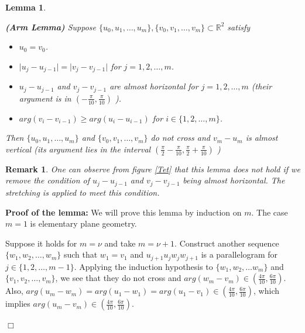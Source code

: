 \documentclass[openright, 12pt]{article}
\newtheorem{lema}[teorema]{Lemma}
\newtheorem{rem}[teorema]{Remark}
\newcommand{\field}[1]{\ensuremath{\mathbb{#1}}}
\newcommand{\R}{\field{R}}
\begin{document}
\begin{lema} \label{Arm}
{\rm \textbf{(Arm Lemma)} Suppose $\{ u_0, u_1, \ldots , u_m     \}, \{ v_0, v_1, \ldots , v_m      \} \subset \R^2$ satisfy
\begin{itemize}
\item $u_0 = v_0$.
\item $\vert u_j - u_{j-1} \vert = \vert v_j - v_{j-1}  \vert$ for $j=1,2, \ldots, m$.
\item $u_{j }- u_{j-1} $ and $v_j - v_{j-1} $ are almost horizontal for $j = 1, 2, \ldots , m$ (their argument is in $\left( -\frac{\pi}{10},\frac{\pi}{10} \right)$ ).
\item $arg (v_{i} - v_{i-1} )\geq arg (u_{i} - u_{i-1})$ for $i \in \{ 1, 2, \ldots, m \} $.
\end{itemize}

Then $\{ u_0, u_1, \ldots , u_m     \}$ and $ \{ v_0, v_1, \ldots , v_m      \}$ do not cross and $v_m - u_m$ is almost vertical (its argument lies in the interval $\left(  \frac{\pi}{2} - \frac{\pi}{10} , \frac{\pi}{2} + \frac{\pi}{10}  \right)$ ) 
}
\end{lema}



\begin{rem}
{\rm One can observe from figure \ref{Tet} that this lemma does not hold if  we remove the condition of $u_{j }- u_{j-1}$ and $ v_j - v_{j-1} $ being almost horizontal. The stretching is applied to meet this condition. 
}
\end{rem}




\textbf{Proof of the lemma: }We will prove this lemma by induction on $m$. The case $m=1$ is elementary plane geometry.


Suppose it holds for $m=\nu$ and take $m = \nu +1$. Construct another sequence $\{ w_1, w_2, \ldots, w_m   \}$ such that $w_1 = v_1$ and $u_{j+1}u_jw_jw_{j+1} $ is a parallelogram for $j \in \{ 1, 2, \ldots , m-1\} $. Applying the induction hypothesis to $\{ w_1, w_2, \ldots w_m   \}$ and $\{v_1, v_2, \ldots, v_m  \}$, we see that they do not cross and $arg( w_{m} - v_m) \in \left(  \frac{4 \pi}{10} , \frac{6\pi}{10}  \right)$. Also, $arg(u_m - w_m )= arg (u_1 - w_1) = arg (u_1 - v_1) \in \left(  \frac{4 \pi}{10} , \frac{6\pi}{10}  \right)$, which implies $arg(u_m - v_m)\in \left(  \frac{4 \pi}{10} , \frac{6\pi}{10}  \right)$.

\hfill $\Box$
\end{document}
